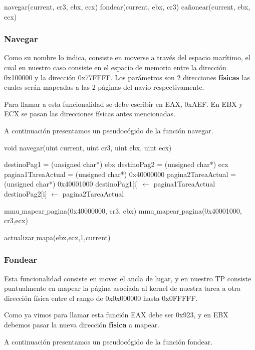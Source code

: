 \begin{algorithmic}
	\State navegar(current, cr3, ebx, ecx)
	\EndIf
		\State fondear(current, ebx, cr3)
	\EndIf
	\State cañonear(current, ebx, ecx)
	\EndIf
\end{algorithmic}

\subsubsection{Navegar}
\par{Como su nombre lo indica, consiste en moverse a través del espacio marítimo, el cual en nuestro caso consiste en el espacio de memoria entre la dirección 0x100000 y la dirección 0x77FFFF. Los parámetros son 2 direcciones \textbf{físicas} las cuales serán mapeadas a las 2 páginas del navío respectivamente.}
\par{Para llamar a esta funcionalidad se debe escribir en EAX, 0xAEF. En EBX y ECX se pasan las direcciones físicas antes mencionadas.}
\par{A continuación presentamos un pseudocógido de la función navegar.}

\begin{algorithm}[h!]
\caption{void navegar(uint current, uint cr3, uint ebx, uint ecx)}
\begin{algorithmic}
	\State destinoPag1 = (unsigned char*) ebx
	\State destinoPag2 = (unsigned char*) ecx
	\State pagina1TareaActual = (unsigned char*) 0x40000000
	\State pagina2TareaActual = (unsigned char*) 0x40001000
		\State destinoPag1[i] $\gets$ pagina1TareaActual
		\State destinoPag2[i] $\gets$ pagina2TareaActual
	\EndFor

	\State mmu$\_$mapear$\_$pagina(0x40000000, cr3, ebx)
	\State mmu$\_$mapear$\_$pagina(0x40001000, cr3,ecx)
	
	\State actualizar$\_$mapa(ebx,ecx,1,current)
	
\end{algorithmic}
\end{algorithm}


\subsubsection{Fondear}
\par{Esta funcionalidad consiste en mover el ancla de lugar, y en nuestro TP consiste puntualmente en mapear la página asociada al kernel de nuestra tarea a otra dirección física entre el rango de 0x0x000000 hasta 0x0FFFFF.}
\par{Como ya vimos para llamar esta función EAX debe ser 0x923, y en EBX debemos pasar la nueva dirección \textbf{física} a mapear.}
\par{A continuación presentamos un pseudocógido de la función fondear.}

